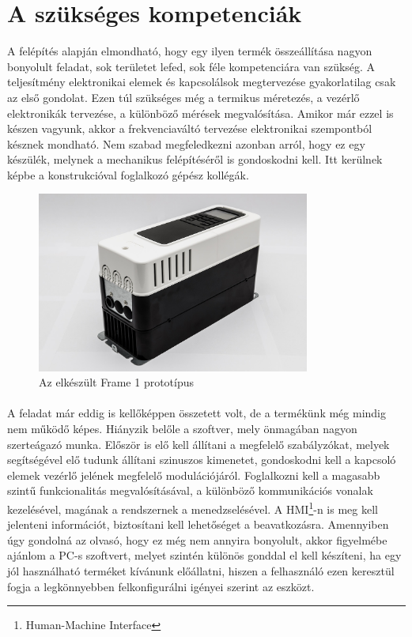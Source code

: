 \section{A szükséges kompetenciák}

A felépítés alapján elmondható, hogy egy ilyen termék összeállítása nagyon bonyolult feladat, sok területet lefed, sok féle kompetenciára van szükség. A teljesítmény elektronikai elemek és kapcsolálsok megtervezése gyakorlatilag csak az első gondolat. Ezen túl szükséges még a termikus méretezés, a vezérlő elektronikák tervezése, a különböző mérések megvalósítása. Amikor már ezzel is készen vagyunk, akkor a frekvenciaváltó tervezése elektronikai szempontból késznek mondható. Nem szabad megfeledkezni azonban arról, hogy ez egy készülék, melynek a mechanikus felépítéséről is gondoskodni kell. Itt kerülnek képbe a konstrukcióval foglalkozó gépész kollégák.

\begin{figure}[h]
	\centering
	\includegraphics[width = 0.8\textwidth]{figures/n700_proto.jpg}
	\caption{Az elkészült Frame 1 prototípus} 
	\label{fig:n700_proto}
\end{figure}

\paragraph{}
A feladat már eddig is kellőképpen összetett volt, de a termékünk még mindig nem működő képes. Hiányzik belőle a szoftver, mely önmagában nagyon szerteágazó munka. Először is elő kell állítani a megfelelő szabályzókat, melyek segítségével elő tudunk állítani szinuszos kimenetet, gondoskodni kell a kapcsoló elemek vezérlő jelének megfelelő modulációjáról. Foglalkozni kell a magasabb szintű funkcionalitás megvalósításával, a különböző kommunikációs vonalak kezelésével, magának a rendszernek a menedzselésével. A HMI\footnote{Human-Machine Interface}-n is meg kell jelenteni információt, biztosítani kell lehetőséget a beavatkozásra. Amennyiben úgy gondolná az olvasó, hogy ez még nem annyira bonyolult, akkor figyelmébe ajánlom a PC-s szoftvert, melyet szintén különös gonddal el kell készíteni, ha egy jól használható terméket kívánunk előállatni, hiszen a felhasználó ezen keresztül fogja a legkönnyebben felkonfigurálni igényei szerint az eszközt.

